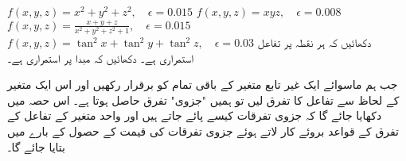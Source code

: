 $f(x,y,z)=x^2+y^2+z^2,\quad \epsilon=0.015$
$f(x,y,z)=xyz,\quad \epsilon=0.008$
$f(x,y,z)=\frac{x+y+z}{x^2+y^2+z^2+1},\quad \epsilon=0.015$
$f(x,y,z)=\tan^2x+\tan^2y+\tan^2z,\quad \epsilon=0.03$
دکھائیں کہ ہر نقطہ   پر تفاعل  استمراری ہے۔ 
دکھائیں کہ مبدا پر  استمراری ہے۔


جب ہم   ماسوائے ایک غیر تابع متغیر  کے باقی تمام  کو برقرار رکھیں اور اس ایک متغیر کے لحاظ سے تفاعل کا تفرق لیں تو ہمیں "جزوی" تفرق حاصل ہوتا ہے۔ اس حصہ میں دکھایا جائے گا کہ جزوی تفرقات کیسے  پائے جاتے ہیں اور واحد متغیر کے تفاعل کے تفرق کے قواعد بروئے کار لاتے ہوئے   جزوی تفرقات   کی قیمت کے حصول کے بارے میں بتایا جائے گا۔

